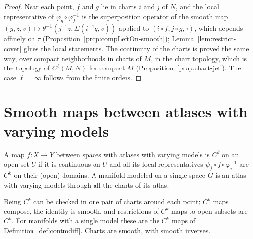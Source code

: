 \begin{proof}
  \leanok
  Near each point, $f$ and $g$ lie in charts $i$ and $j$ of $N$, and the local representative of
  $\varphi_g \circ \varphi_f^{-1}$ is the superposition operator of the smooth map
  $(y, z, v) \mapsto \theta^{-1}(j^{-1} z, \Sigma(i^{-1} y, v))$ applied to
  $(i \circ f, j \circ g, \tau)$, which depends affinely on $\tau$
  (Proposition~\ref{prop:compLeftOn-smooth}); Lemma~\ref{lem:restrict-cover} glues the local
  statements. The continuity of the charts is proved the same way, over compact neighborhoods in
  charts of $M$, in the chart topology, which is the topology of $C^\ell(M, N)$ for compact $M$
  (Proposition~\ref{prop:chart-jet}). The case $\ell = \infty$ follows from the finite orders.
\end{proof}

\section{Smooth maps between atlases with varying models}

\begin{definition}
  \label{def:varying-ck}
  \leanok
  A map $f \colon X \to Y$ between spaces with atlases with varying models is $C^k$ on an open set
  $U$ if it is continuous on $U$ and all its local representatives $\psi_j \circ f \circ
  \varphi_i^{-1}$ are $C^k$ on their (open) domains. A manifold modeled on a single space $G$ is an
  atlas with varying models through all the charts of its atlas.
\end{definition}

\begin{proposition}
  \label{prop:varying-ck-basic}
  \leanok
  Being $C^k$ can be checked in one pair of charts around each point; $C^k$ maps compose, the
  identity is smooth, and restrictions of $C^k$ maps to open subsets are $C^k$. For manifolds with a
  single model these are the $C^k$ maps of Definition~\ref{def:contmdiff}. Charts are smooth,
  with smooth inverses.
\end{proposition}

